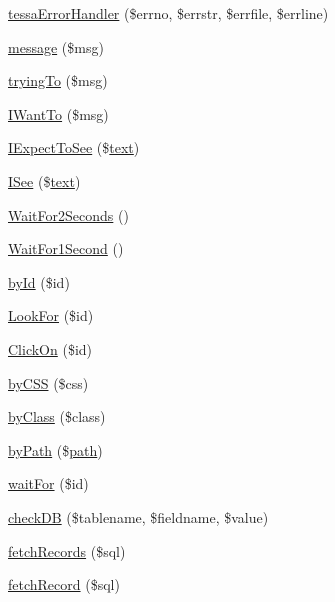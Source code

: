 \begin{DoxyCompactItemize}
\item 
\hyperlink{Tessa_8php_af0c8babb876f6ec17169e3c8b88d5c28}{tessa\+Error\+Handler} (\$errno, \$errstr, \$errfile, \$errline)
\item 
\hyperlink{Tessa_8php_a37ab31c170417027f819bfc053d7cd39}{message} (\$msg)
\item 
\hyperlink{Tessa_8php_aa69ddc0af69161f83509e8b26c683e13}{trying\+To} (\$msg)
\item 
\hyperlink{Tessa_8php_a743872d307323bf8cef1cc94ed6324ee}{I\+Want\+To} (\$msg)
\item 
\hyperlink{Tessa_8php_a28ecccffe3517c38607586b303e312c1}{I\+Expect\+To\+See} (\$\hyperlink{Shape_8php_a37df362c2f77a0045fa8af094f432238}{text})
\item 
\hyperlink{Tessa_8php_a2cddd9ec74ad10a2e186f6ebadbae49b}{I\+See} (\$\hyperlink{Shape_8php_a37df362c2f77a0045fa8af094f432238}{text})
\item 
\hyperlink{Tessa_8php_a4408ae641f64cfc2e35afc782627f928}{Wait\+For2\+Seconds} ()
\item 
\hyperlink{Tessa_8php_a306f2b424894a2d9822b6413896ac843}{Wait\+For1\+Second} ()
\item 
\hyperlink{Tessa_8php_ab95005eff1f9e68fea369195c0bcfbd0}{by\+Id} (\$id)
\item 
\hyperlink{Tessa_8php_a6e436b807e73d7ec9d079fab9161cc21}{Look\+For} (\$id)
\item 
\hyperlink{Tessa_8php_a88614f7b70716a76a4272513e78f8ee8}{Click\+On} (\$id)
\item 
\hyperlink{Tessa_8php_ab8c3c1069483884b873b5081aa6d3b2c}{by\+C\+S\+S} (\$css)
\item 
\hyperlink{Tessa_8php_a30df4457cf7045bec2a81cfc1769377f}{by\+Class} (\$class)
\item 
\hyperlink{Tessa_8php_a0b6fd6f3b50bb6a75f821177055a853a}{by\+Path} (\$\hyperlink{Shape_8php_a3b05eec13add53df44e232273d718ae4}{path})
\item 
\hyperlink{Tessa_8php_a8cbd3ab64f5ba8c070f5762d8684aaa6}{wait\+For} (\$id)
\item 
\hyperlink{Tessa_8php_a45fa3c4912bbefca9353dab66fd5030e}{check\+D\+B} (\$tablename, \$fieldname, \$value)
\item 
\hyperlink{Tessa_8php_ad82e3558ce8c93c2830b80af26a758b4}{fetch\+Records} (\$sql)
\item 
\hyperlink{Tessa_8php_a2f38c767e68dbdbb9f190d9d84f4fe92}{fetch\+Record} (\$sql)
\item 

\end{DoxyCompactItemize}
